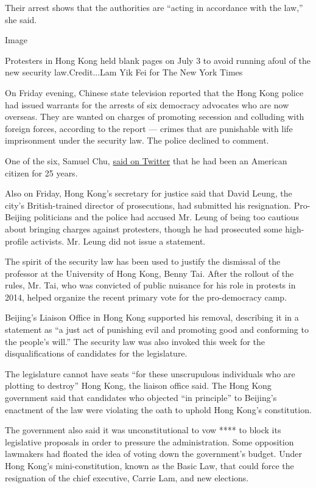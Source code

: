 Their arrest shows that the authorities are ``acting in accordance with
the law,'' she said.

Image

Protesters in Hong Kong held blank pages on July 3 to avoid running
afoul of the new security law.Credit...Lam Yik Fei for The New York
Times

On Friday evening, Chinese state television reported that the Hong Kong
police had issued warrants for the arrests of six democracy advocates
who are now overseas. They are wanted on charges of promoting secession
and colluding with foreign forces, according to the report --- crimes
that are punishable with life imprisonment under the security law. The
police declined to comment.

One of the six, Samuel Chu,
\href{https://twitter.com/samuelmchu/status/1289256588868370432}{said on
Twitter} that he had been an American citizen for 25 years.

Also on Friday, Hong Kong's secretary for justice said that David Leung,
the city's British-trained director of prosecutions, had submitted his
resignation. Pro-Beijing politicians and the police had accused Mr.
Leung of being too cautious about bringing charges against protesters,
though he had prosecuted some high-profile activists. Mr. Leung did not
issue a statement.

The spirit of the security law has been used to justify the dismissal of
the professor at the University of Hong Kong, Benny Tai. After the
rollout of the rules, Mr. Tai, who was convicted of public nuisance for
his role in protests in 2014, helped organize the recent primary vote
for the pro-democracy camp.

Beijing's Liaison Office in Hong Kong supported his removal, describing
it in a statement as ``a just act of punishing evil and promoting good
and conforming to the people's will.'' The security law was also invoked
this week for the disqualifications of candidates for the legislature.

The legislature cannot have seats ``for these unscrupulous individuals
who are plotting to destroy'' Hong Kong, the liaison office said. The
Hong Kong government said that candidates who objected ``in principle''
to Beijing's enactment of the law were violating the oath to uphold Hong
Kong's constitution.

The government also said it was unconstitutional to vow **** to block
its legislative proposals in order to pressure the administration. Some
opposition lawmakers had floated the idea of voting down the
government's budget. Under Hong Kong's mini-constitution, known as the
Basic Law, that could force the resignation of the chief executive,
Carrie Lam, and new elections.

